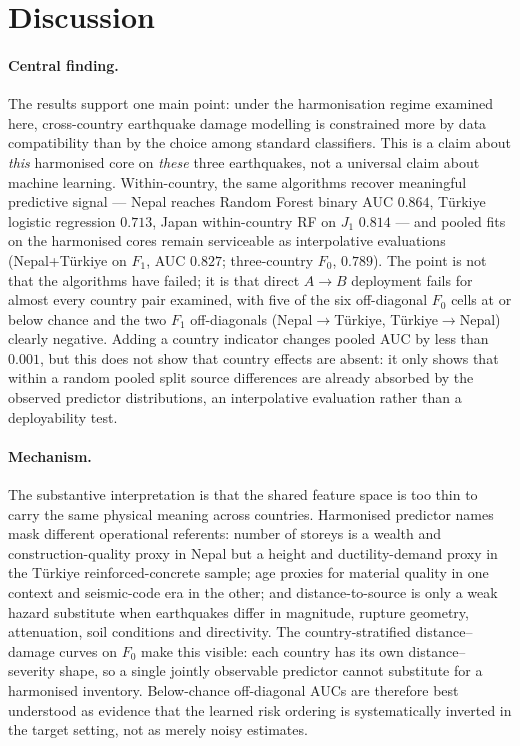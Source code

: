 \documentclass[11pt,a4paper]{article}
\begin{document}
\section{Discussion}
\label{sec:discussion}

\paragraph{Central finding.} The results support one main point: under the harmonisation regime examined here, cross-country earthquake damage modelling is constrained more by data compatibility than by the choice among standard classifiers. This is a claim about \emph{this} harmonised core on \emph{these} three earthquakes, not a universal claim about machine learning. Within-country, the same algorithms recover meaningful predictive signal --- Nepal reaches Random Forest binary AUC $0.864$, T\"urkiye logistic regression $0.713$, Japan within-country RF on $J_1$ $0.814$ --- and pooled fits on the harmonised cores remain serviceable as interpolative evaluations (Nepal+T\"urkiye on $F_1$, AUC $0.827$; three-country $F_0$, $0.789$). The point is not that the algorithms have failed; it is that direct $A \rightarrow B$ deployment fails for almost every country pair examined, with five of the six off-diagonal $F_0$ cells at or below chance and the two $F_1$ off-diagonals (Nepal$\rightarrow$T\"urkiye, T\"urkiye$\rightarrow$Nepal) clearly negative. Adding a country indicator changes pooled AUC by less than $0.001$, but this does not show that country effects are absent: it only shows that within a random pooled split source differences are already absorbed by the observed predictor distributions, an interpolative evaluation rather than a deployability test.

\paragraph{Mechanism.} The substantive interpretation is that the shared feature space is too thin to carry the same physical meaning across countries. Harmonised predictor names mask different operational referents: number of storeys is a wealth and construction-quality proxy in Nepal but a height and ductility-demand proxy in the T\"urkiye reinforced-concrete sample; age proxies for material quality in one context and seismic-code era in the other; and distance-to-source is only a weak hazard substitute when earthquakes differ in magnitude, rupture geometry, attenuation, soil conditions and directivity. The country-stratified distance--damage curves on $F_0$ make this visible: each country has its own distance--severity shape, so a single jointly observable predictor cannot substitute for a harmonised inventory. Below-chance off-diagonal AUCs are therefore best understood as evidence that the learned risk ordering is systematically inverted in the target setting, not as merely noisy estimates.
\end{document}
